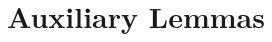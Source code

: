 \documentclass[twoside,11pt]{article}
\begin{document}





 





\section{Auxiliary Lemmas}
\end{document}
